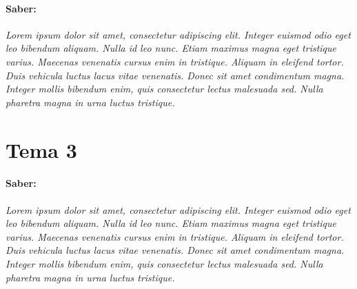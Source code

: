 \paragraph{Saber: }
\textit{
Lorem ipsum dolor sit amet, consectetur adipiscing elit. Integer euismod odio eget leo bibendum aliquam. Nulla id leo nunc. Etiam maximus magna eget tristique varius. Maecenas venenatis cursus enim in tristique. Aliquam in eleifend tortor. Duis vehicula luctus lacus vitae venenatis. Donec sit amet condimentum magna. Integer mollis bibendum enim, quis consectetur lectus malesuada sed. Nulla pharetra magna in urna luctus tristique.
}

\section{Tema 3}
\paragraph{Saber: }
\textit{
Lorem ipsum dolor sit amet, consectetur adipiscing elit. Integer euismod odio eget leo bibendum aliquam. Nulla id leo nunc. Etiam maximus magna eget tristique varius. Maecenas venenatis cursus enim in tristique. Aliquam in eleifend tortor. Duis vehicula luctus lacus vitae venenatis. Donec sit amet condimentum magna. Integer mollis bibendum enim, quis consectetur lectus malesuada sed. Nulla pharetra magna in urna luctus tristique.
}